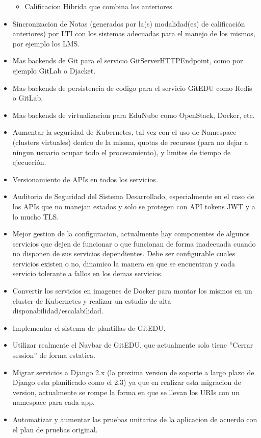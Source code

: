 \begin{itemize}
\begin{itemize}
        \item Calificacion Hibrida que combina los anteriores.
    \end{itemize}
    \item Sincronizacion de Notas (generados por la(s) modalidad(es) de calificación anteriores) por LTI con los sistemas adecuadas para el manejo de los mismos, por ejemplo los LMS.
    \item Mas backends de Git para el servicio GitServerHTTPEndpoint, como por ejemplo GitLab o Djacket.
    \item Mas backends de persistencia de codigo para el servicio GitEDU como Redis o GitLab.
    \item Mas backends de virtualizacion para EduNube como OpenStack, Docker, etc.
    \item Aumentar la seguridad de Kubernetes, tal vez con el uso de Namespace (clusters virtuales) dentro de la misma, quotas de recursos (para no dejar a ningun usuario ocupar todo el procesamiento), y limites de tiempo de ejecucción.
    \item Versionamiento de APIs en todos los servicios.
    \item Auditoria de Seguridad del Sistema Desarrollado, especialmente en el caso de los APIs que no manejan estados y solo se protegen con API tokens JWT y a lo mucho TLS.
    \item Mejor gestion de la configuracion, actualmente hay componentes de algunos servicios que dejen de funcionar o que funcionan de forma inadecuada cuando no disponen de sus servicios dependientes. Debe ser configurable cuales servicios existen o no, dinamico la manera en que se encuentran y cada servicio tolerante a fallos en los demas servicios.
    \item Convertir los servicios en imagenes de Docker para montar los mismos en un cluster de Kubernetes y realizar un estudio de alta disponabilidad/escalabilidad.
    \item Implementar el sistema de plantillas de GitEDU.
    \item Utilizar realmente el Navbar de GitEDU, que actualmente solo tiene ''Cerrar session'' de forma estatica.
    \item Migrar servicios a Django 2.x (la proxima version de soporte a largo plazo de Django esta planificado como el 2.3) ya que en realizar esta migracion de version, actualmente se rompe la forma en que se llevan los URIs con un namespace para cada app.
    \item Automatizar y aumentar las pruebas unitarias de la aplicacion de acuerdo con el plan de pruebas original.

\end{itemize}
